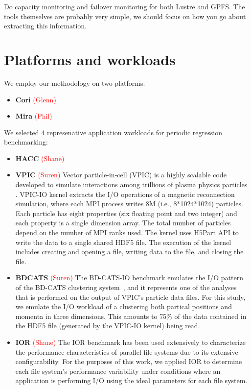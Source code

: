 \documentclass[conference,10pt,compsocconf]{IEEEtran}
\newcommand{\assign}[1]{\textcolor{red}{(#1)}}
\begin{document}
Do capacity monitoring and failover monitoring for both Lustre and GPFS.  The
tools themselves are probably very simple, we should focus on how you go
about extracting this information.

\section{Platforms and workloads} \label{platforms}

We employ our methodology on two platforms:

\begin{itemize}
\item \textbf{Cori} \assign{Glenn}
\item \textbf{Mira} \assign{Phil}
\end{itemize}

We selected 4 represenative application workloads for periodic regression
benchmarking:

\begin{itemize}
\item \textbf{HACC} \assign{Shane}
\item \textbf{VPIC} \assign{Suren} 
Vector particle-in-cell (VPIC) is a highly scalable code developed to simulate
interactions among trillions of plasma physics particles  \cite{Bowers2008}.
VPIC-IO kernel extracts the I/O operations of a magnetic reconnection
simulation, where each MPI process writes 8M (i.e., 8*1024*1024) particles. Each
particle has eight properties (six floating point and two integer) and each
property is a single dimension array. The total number of particles depend on
the number of MPI ranks used. The kernel uses H5Part API \cite{H5Part} to write
the data to a single shared HDF5 file. The execution of the kernel includes
creating and opening a file, writing data to the file, and closing the file.

\item \textbf{BDCATS} \assign{Suren} The BD-CATS-IO benchmark emulates the I/O
pattern of the BD-CATS clustering system~\cite{Patwary2015}, and it represents
one of the analyses that is performed on the output of VPIC's particle data files.
For this study, we emulate the I/O workload of a clustering both partical
positions and momenta in three dimensions.  This amounts to 75\% of the data
contained in the HDF5 file (generated by the VPIC-IO kernel) being read.

\item \textbf{IOR} \assign{Shane} The IOR benchmark has been used extensively
to characterize the performance characteristics of parallel file systems\cite{Yildiz2016,Xie2012,Lofstead2010,Uselton2010}
due to its extensive configurability.  For the purposes of this work, we applied
IOR to determine each file system's performance variability under conditions
where an application is performing I/O using the ideal parameters for each
file system.

\end{itemize}
\end{document}
